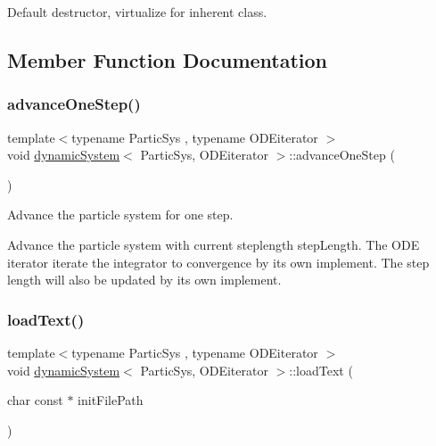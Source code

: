 Default destructor, virtualize for inherent class. 



\subsection{Member Function Documentation}
\mbox{\label{classdynamic_system_a7a4032c043dd0286007f4d7c542d3f95}} 
\subsubsection{\texorpdfstring{advance\+One\+Step()}{advanceOneStep()}}
{\footnotesize\ttfamily template$<$typename Partic\+Sys , typename O\+D\+Eiterator $>$ \\
void \mbox{\hyperlink{classdynamic_system}{dynamic\+System}}$<$ Partic\+Sys, O\+D\+Eiterator $>$\+::advance\+One\+Step (\begin{DoxyParamCaption}{ }\end{DoxyParamCaption})\hspace{0.3cm}{\ttfamily [inline]}}



Advance the particle system for one step. 

Advance the particle system with current steplength step\+Length. The O\+DE iterator iterate the integrator to convergence by its own implement. The step length will also be updated by its own implement. \mbox{\label{classdynamic_system_a3ff4342241733e94edce17c1a79a90a8}} 
\subsubsection{\texorpdfstring{load\+Text()}{loadText()}}
{\footnotesize\ttfamily template$<$typename Partic\+Sys , typename O\+D\+Eiterator $>$ \\
void \mbox{\hyperlink{classdynamic_system}{dynamic\+System}}$<$ Partic\+Sys, O\+D\+Eiterator $>$\+::load\+Text (\begin{DoxyParamCaption}\item[{char const $\ast$}]{init\+File\+Path }\end{DoxyParamCaption})}



